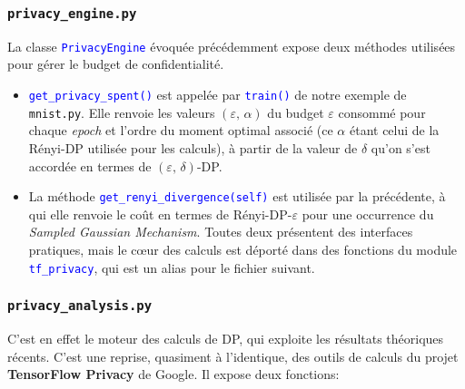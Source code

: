 \documentclass[a4paper,11pt]{article} %
\newcommand{\ttt}[1]{\texttt{#1}}
\newcommand{\file}[1]{\colorbox{blue!10}{\texttt{#1}}}
\newcommand{\code}[1]{\textcolor{blue}{\texttt{#1}}}
\begin{document}
\subsubsection{\ttt{privacy\_engine.py}}
La classe \code{PrivacyEngine} évoquée précédemment expose deux méthodes utilisées pour gérer le budget de confidentialité.
\begin{itemize}
    \item 
    \code{get\_privacy\_spent()} est appelée par \code{train()} de notre exemple de \file{mnist.py}. Elle renvoie les valeurs $(\varepsilon,\,\alpha)$ du budget $\varepsilon$ consommé  pour chaque \emph{epoch} et l'ordre du moment optimal associé (ce $\alpha$ étant celui de la Rényi-DP utilisée pour les calculs), à partir de la valeur de $\delta$ qu'on s'est accordée en termes de $(\varepsilon,\,\delta)$-DP.
    \item 
    La méthode \code{get\_renyi\_divergence(self)} est utilisée par la précédente, à qui elle renvoie le coût en termes de Rényi-DP-$\varepsilon$ pour une occurrence du \emph{Sampled Gaussian Mechanism}. Toutes deux présentent des interfaces pratiques, mais le cœur des calculs est déporté dans des fonctions du module \code{tf\_privacy}, qui est un alias pour le  fichier suivant.
\end{itemize}
%
\subsubsection{\ttt{privacy\_analysis.py}}
%
C'est en effet le moteur des calculs de DP, qui exploite les résultats théoriques récents. C'est une reprise, quasiment à l'identique, des outils de calculs du projet \textbf{TensorFlow Privacy} de Google. Il expose deux fonctions:
\end{document}
